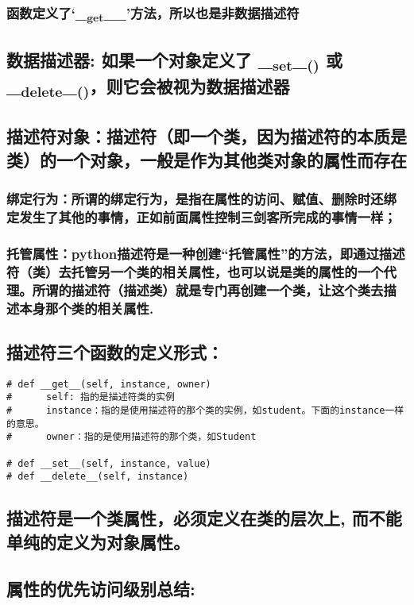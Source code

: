 \documentclass[11pt]{article}
\begin{document}
\subsubsection{函数定义了`\_\textsubscript{get}\_\_'方法，所以也是非数据描述符}
\label{sec:orgcc1ea76}
\subsection{数据描述器: 如果一个对象定义了 \_\textsubscript{set}\_\textsubscript{()} 或 \_\textsubscript{delete}\_\textsubscript{()}，则它会被视为数据描述器}
\label{sec:orgdaaa439}
\subsection{描述符对象：描述符（即一个类，因为描述符的本质是类）的一个对象，一般是作为其他类对象的属性而存在}
\label{sec:orgeba938b}
\subsubsection{绑定行为：所谓的绑定行为，是指在属性的访问、赋值、删除时还绑定发生了其他的事情，正如前面属性控制三剑客所完成的事情一样；}
\label{sec:orgcfd65c5}
\subsubsection{托管属性：python描述符是一种创建“托管属性”的方法，即通过描述符（类）去托管另一个类的相关属性，也可以说是类的属性的一个代理。所谓的描述符（描述类）就是专门再创建一个类，让这个类去描述本身那个类的相关属性.}
\label{sec:org6c0027e}
\subsection{描述符三个函数的定义形式：}
\label{sec:orgda29741}
\begin{verbatim}
# def __get__(self, instance, owner)
#      self: 指的是描述符类的实例
#      instance：指的是使用描述符的那个类的实例，如student。下面的instance一样的意思。
#      owner：指的是使用描述符的那个类，如Student

# def __set__(self, instance, value)
# def __delete__(self, instance)
\end{verbatim}
\subsection{描述符是一个类属性，必须定义在类的层次上, 而不能单纯的定义为对象属性。}
\label{sec:org9858212}
\subsection{属性的优先访问级别总结:}
\label{sec:org1d062af}
\end{document}
